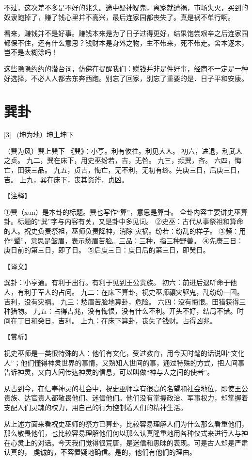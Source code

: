 \documentclass[12pt,UTF8]{ctexbook}
\begin{document}
不过，这次差不多是不好的兆头。途中疑神疑鬼，离家就遭祸，市场失火，买到的奴隶跑掉了，赚了钱心里并不高兴，最后连家园都丧失了。真是祸不单行啊。

看来，赚钱并不是好事。赚钱本来是为了日子过得更好，结果饱尝艰辛之后连家园都保不住，还有什么意思？钱财本是身外之物，生不带来，死不带走。舍本逐末，岂不是太糊涂吗！

这些隐隐约约的潜台词，仿佛在提醒我们：赚钱并非是件好事，经商不一定是一种好选择，不必人人都去东奔西跑。别忘了回家，别忘了重要的是．日子平和安康。

\chapter{巽卦}

[3] \ (坤为地）坤上坤下

（巽为风）巽上巽下
《巽》：小亨。利有攸往。利见大人。
初六，进退，利武人之贞。
九二，巽在床下，用史巫纷若，吉，无咎。
九三，频巽，吝。
六四，悔亡，田获三品。
九五，贞吉，悔亡，无不利，无初有终。先庚三日，后庚三日，吉。
上九，巽在床下，丧其资斧，贞凶。

【注释】

①巽（xun）是本卦的标题。巽也写作“算”，意思是算卦。 全卦内容主要讲史巫算卦。标题的“巽”字与内容有关，又是卦中多见词。
②史巫：古代从事祭祖和算命的人。祝史负责祭祖，巫师负责降神，消除 灾祸。纷若：纷乱的样子。
③频：用作“颦”，意思是皱眉，表示愁眉苦脸。三品：三种，指三种野兽。
④先庚三日：庚日前的第三日，即了日。
⑤后庚三日：庚日后的第三日，即癸日。

【译文】

巽卦：小亨通。有利于出行。有利于见到王公贵族。
初六：前进后退听命于他人，有利于军人的占问。
九二：在床下算卦，祝史巫师禳灾驱鬼，乱纷纷一团。吉利，没有灾祸。
九三：愁眉苦脸地算卦，危险。
六四：没有悔恨。田猎获得三种猎物。
九五：占得吉兆，没有悔恨，没有什么不利。开头不好，结局不错。时间在丁日和癸日，吉利。
上九：在床下算卦，丧失了钱财。占得凶兆。

【赏析】

祝史巫师是一类很特殊的人：他们有文化，受过教育，用今天时髦的话说叫“文化人”；他们懂得神灵世界的事情，又熟知人世间的事，通过特殊的方式，把人间事告诉神灵，又向人间传达神灵的信息，可以叫做“神与人之间的使者”。

从古到今，在信奉神灵的社会中，祝史巫师享有很高的名望和社会地位，即使王公贵族、达官责人都敬畏他们、迷信他们。他们没有掌握政治、军事权力，却掌握着支配人们灵魂的权力，用自己的行为控制着人们的精神生活。

从上述方面来看祝史巫师的祭方已算卦，比较容易理解人们为什么那么看重他们，那么敬畏他们，也比较容易理解他们何以那么认真隆重地用各种仪式来进行人与神在心灵上的对话。今天我们觉得很荒唐，是迷信和愚昧的表现。可是古人却是严肃认真的， 虔诚的，不容置疑地确信。是的，他们有他们的理由。
\end{document}
